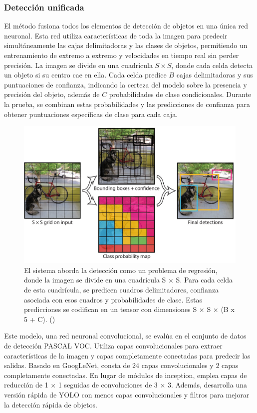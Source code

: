  \subsubsection{Detección unificada}
El método fusiona todos los elementos de detección de objetos en una única red neuronal. Esta red utiliza características de toda la imagen para predecir simultáneamente las cajas delimitadoras y las clases de objetos, permitiendo un entrenamiento de extremo a extremo y velocidades en tiempo real sin perder precisión. La imagen se divide en una cuadrícula $S \times S$, donde cada celda detecta un objeto si su centro cae en ella. Cada celda predice $B$ cajas delimitadoras y sus puntuaciones de confianza, indicando la certeza del modelo sobre la presencia y precisión del objeto, además de $C$ probabilidades de clase condicionales. Durante la prueba, se combinan estas probabilidades y las predicciones de confianza para obtener puntuaciones específicas de clase para cada caja.

  \begin{figure}[H]
	\begin{center}
		\includegraphics[width=1\textwidth]{2/figures/yolo2.jpeg}
		\caption{El sistema aborda la detección como un problema de regresión, donde la imagen se divide en una cuadrícula S × S. Para cada celda de esta cuadrícula, se predicen cuadros delimitadores, confianza asociada con esos cuadros y probabilidades de clase. Estas predicciones se codifican en un tensor con dimensiones S × S × (B x 5 + C). (\cite{tecnica4})}
	\end{center}
\end{figure}

Este modelo, una red neuronal convolucional, se evalúa en el conjunto de datos de detección PASCAL VOC. Utiliza capas convolucionales para extraer características de la imagen y capas completamente conectadas para predecir las salidas. Basado en GoogLeNet, consta de 24 capas convolucionales y 2 capas completamente conectadas. En lugar de módulos de inception, emplea capas de reducción de 1 × 1 seguidas de convoluciones de 3 × 3. Además, desarrolla una versión rápida de YOLO con menos capas convolucionales y filtros para mejorar la detección rápida de objetos.

